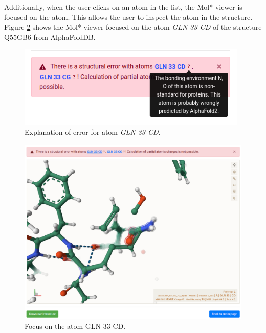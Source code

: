 \documentclass[
  digital,     %
  oneside,     %
  nosansbold,  %
  nocolorbold, %
  lof,         %
  lot,         %
]{fithesis4}
\begin{document}
Additionally, when the user clicks on an atom in the list, the Mol* viewer is focused on the atom. This allows the user to inspect the atom in the structure. Figure \ref{fig:wrong_structure_focus} shows the Mol* viewer focused on the atom \textit{GLN 33 CD} of the structure Q55GB6 from AlphaFoldDB.

\begin{figure}[htbp]
  \begin{center}
    \includegraphics[width=11cm]{figures/wrong_structure_text.png}
  \end{center}
  \caption{Explanation of error for atom \textit{GLN 33 CD}.}
  \label{fig:wrong_structure_text}
\end{figure}

\begin{figure}[htbp]
  \begin{center}
    \includegraphics[width=\textwidth]{figures/wrong_structure_focus.png}
  \end{center}
  \caption{Focus on the atom GLN 33 CD.}
  \label{fig:wrong_structure_focus}
\end{figure}
\end{document}
